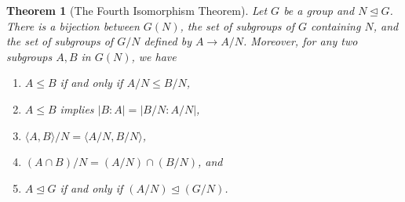 \documentclass[12pt]{article}
\def\ang#1{\langle{#1}\rangle}
\newtheorem{thm}{Theorem}
\begin{document}
\begin{thm}[The Fourth Isomorphism Theorem]
Let $G$ be a group and $N\unlhd G$. There is a bijection between $G(N)$, the set of subgroups of $G$ containing $N$, and the set of subgroups of $G/N$ defined by $A\rightarrow A/N$. Moreover, for any two subgroups $A,B$ 
in $G(N)$, we have
\begin{enumerate}
\item $A\leq B$ if and only if $A/N\leq B/N$,
\item $A\leq B$ implies $|B:A|=|B/N:A/N|$,
\item $\ang{A,B}/N=\ang{A/N,B/N}$,
\item $(A\cap B)/N=(A/N)\cap (B/N)$, and
\item $A\unlhd G$ if and only if  $(A/N)\unlhd (G/N)$.
\end{enumerate}
\end{thm}
\end{document}
